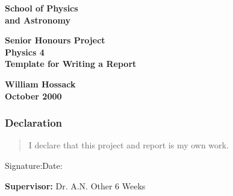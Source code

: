 \documentclass[a4paper,12pt]{article}
\begin{document}
\pagestyle{empty}                       %
\epsfxsize=40mm                         %
\begin{minipage}[b]{110mm}
        {\Huge\bf School of Physics\\ and Astronomy
        \vspace*{17mm}}
\end{minipage}
\hfill
\begin{minipage}[t]{40mm}               
\end{minipage}
\par\noindent                                           %
\vspace*{2cm}
\begin{center}
        \Large\bf \Large\bf Senior Honours Project\\
        \Large\bf Physics 4\\[10pt]                     %
        \LARGE\bf Template for Writing a Report         %
\end{center}
\vspace*{0.5cm}
\begin{center}
        \bf William Hossack\\                           %
        October 2000                                    %
\end{center}
\vspace*{5mm}
%
%                       
\begin{abstract}
        
\end{abstract}

\vspace*{1cm}

\subsubsection*{Declaration}

\begin{quotation}
        I declare that this project and report is my own work.
\end{quotation}

\vspace*{2cm}
Signature:\hspace*{8cm}Date:

\vfill
{\bf Supervisor:} Dr. A.N. Other                %
\hfill
6 Weeks                                         %
\newpage
%
\pagestyle{plain}                               %
\setcounter{page}{1}                            %
\tableofcontents                                %
 




\end{document}
